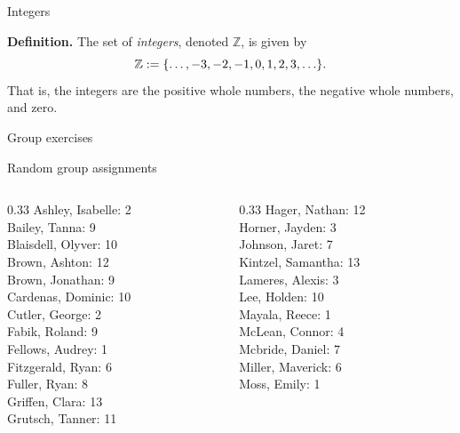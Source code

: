 \documentclass[10pt]{beamer}
\begin{document}
\begin{frame}{Integers}

\begin{mygreenbox}
\textbf{Definition.} The set of \textit{integers}, denoted $\mathbb{Z}$, is given by
\[\mathbb{Z} := \{ {\hdots, -3, -2, -1, 0, 1, 2, 3, \hdots} \}. \]
That is, the integers are the positive whole numbers, the negative whole numbers, and zero.
\end{mygreenbox}

\end{frame}


\begin{frame}[standout]
Group exercises
\end{frame}

\begin{frame}{Random group assignments}
\footnotesize 
\vfill 
\begin{columns}
\begin{column}{0.33\textwidth}
Ashley, Isabelle: 2 \\ 
Bailey, Tanna: 9 \\ 
Blaisdell, Olyver: 10 \\ 
Brown, Ashton: 12 \\ 
Brown, Jonathan: 9 \\ 
Cardenas, Dominic: 10 \\ 
Cutler, George: 2 \\ 
Fabik, Roland: 9 \\ 
Fellows, Audrey: 1 \\ 
Fitzgerald, Ryan: 6 \\ 
Fuller, Ryan: 8 \\ 
Griffen, Clara: 13 \\ 
Grutsch, Tanner: 11 \\\end{column}
\begin{column}{0.33\textwidth}
Hager, Nathan: 12 \\ 
Horner, Jayden: 3 \\ 
Johnson, Jaret: 7 \\ 
Kintzel, Samantha: 13 \\ 
Lameres, Alexis: 3 \\ 
Lee, Holden: 10 \\ 
Mayala, Reece: 1 \\ 
McLean, Connor: 4 \\ 
Mcbride, Daniel: 7 \\ 
Miller, Maverick: 6 \\ 
Moss, Emily: 1 \\ 

\end{column}
\end{columns}
\end{frame}
\end{document}

